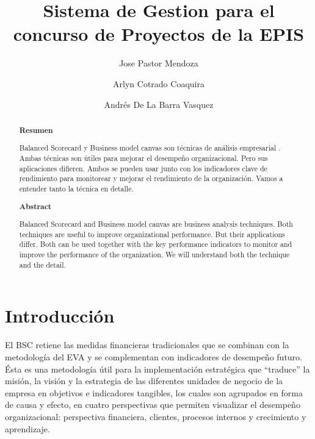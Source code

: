 \documentclass[%
 reprint,
 amsmath,amssymb,
 aps,
]{revtex4-1}
\begin{document}
\title{Sistema de Gestion para el concurso de Proyectos de la EPIS}
\author{Jose Pastor Mendoza}
\author{Arlyn Cotrado Coaquira}
\author{Andrés De La Barra Vasquez}
%

\begin{abstract}
\begin{center}
\textbf{Resumen}
\end{center}
Balanced Scorecard y Business model canvas son técnicas de análisis empresarial . Ambas técnicas son útiles para mejorar el desempeño organizacional. Pero sus aplicaciones difieren. Ambos se pueden usar junto con los indicadores clave de rendimiento para monitorear y mejorar el rendimiento de la organización. Vamos a entender tanto la técnica en detalle.


\begin{center}
\textbf{Abstract}
\end{center}
Balanced Scorecard and Business model canvas are business analysis techniques. Both techniques are useful to improve organizational performance. But their applications differ. Both can be used together with the key performance indicators to monitor and improve the performance of the organization. We will understand both the technique and the detail.

\end{abstract}



\maketitle


\section {Introducción}

El BSC retiene las medidas financieras tradicionales que se combinan con la metodología del EVA y se complementan con indicadores de desempeño futuro.\\
Ésta es una metodología útil para la implementación estratégica que “traduce” la misión, la visión y la estrategia de las diferentes unidades de negocio de la\\
empresa en objetivos e indicadores tangibles, los cuales son agrupados en forma de causa y efecto, en cuatro perspectivas que permiten visualizar el desempeño\\
organizacional: perspectiva financiera, clientes, procesos internos y crecimiento y aprendizaje.\\
\end{document}
